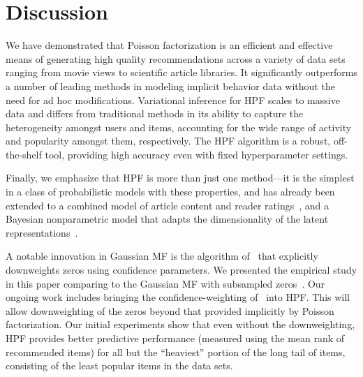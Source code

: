 \section{Discussion}
We have demonstrated that Poisson factorization is an efficient and
effective means of generating high quality recommendations across a
variety of data sets ranging from movie views to scientific article
libraries. It significantly outperforms a number of leading methods in
modeling implicit behavior data without the need for ad hoc
modifications. Variational inference for HPF scales to massive data
and differs from traditional methods in its ability to capture the
heterogeneity amongst users and items, accounting for the wide range
of activity and popularity amongst them, respectively. The HPF
algorithm is a robust, off-the-shelf tool, providing high accuracy
even with fixed hyperparameter settings.


Finally, we emphasize that HPF is more than just one method---it is
the simplest in a class of probabilistic models with these properties,
and has already been extended to a combined model of article content
and reader ratings~\cite{gopalan2014content}, and a Bayesian
nonparametric model that adapts the dimensionality of the latent
representations~\cite{gopalan2014bayesian}.

A notable innovation in Gaussian MF is the algorithm
of~\cite{Hu:2008p9402} that explicitly downweights zeros using
confidence parameters. We presented the empirical study in this paper
comparing to the Gaussian MF with subsampled
zeros~\cite{Koren:2009}. Our ongoing work includes bringing the
confidence-weighting of~\cite{Hu:2008p9402} into HPF.
This will allow downweighting of the zeros beyond that provided
implicitly by Poisson factorization. Our initial experiments show that
even without the downweighting, HPF provides better predictive
performance (measured using the mean rank of recommended items) for
all but the ``heaviest'' portion of the long tail of items, consisting
of the least popular items in the data sets.


